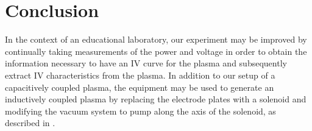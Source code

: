 \documentclass[reprint]{revtex4-1}
\begin{document}
\section{Conclusion}

In the context of an educational laboratory, our experiment may be improved by continually taking measurements of the power and voltage in order to obtain the information necessary to have an IV curve for the plasma and subsequently extract IV characteristics from the plasma. In addition to our setup of a capacitively coupled plasma,  the equipment may be used to generate an inductively coupled plasma by replacing the electrode plates with a solenoid and modifying the vacuum system to pump along the axis of the solenoid, as described in \cite{physics-radio-frequency,Jiayin2010}.


\end{document}
